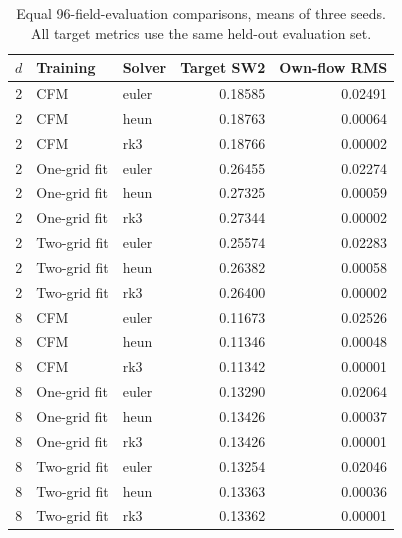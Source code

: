\begin{table}[ht]
\centering
\caption{Equal 96-field-evaluation comparisons, means of three seeds. All target metrics use the same held-out evaluation set.}
\label{tab:equal-nfe-new}
\begin{tabular}{@{}cllrr@{}}
\toprule
$d$ & Training & Solver & Target SW2 & Own-flow RMS\\
\midrule
2 & CFM & euler & 0.18585 & 0.02491\\
2 & CFM & heun & 0.18763 & 0.00064\\
2 & CFM & rk3 & 0.18766 & 0.00002\\
2 & One-grid fit & euler & 0.26455 & 0.02274\\
2 & One-grid fit & heun & 0.27325 & 0.00059\\
2 & One-grid fit & rk3 & 0.27344 & 0.00002\\
2 & Two-grid fit & euler & 0.25574 & 0.02283\\
2 & Two-grid fit & heun & 0.26382 & 0.00058\\
2 & Two-grid fit & rk3 & 0.26400 & 0.00002\\
8 & CFM & euler & 0.11673 & 0.02526\\
8 & CFM & heun & 0.11346 & 0.00048\\
8 & CFM & rk3 & 0.11342 & 0.00001\\
8 & One-grid fit & euler & 0.13290 & 0.02064\\
8 & One-grid fit & heun & 0.13426 & 0.00037\\
8 & One-grid fit & rk3 & 0.13426 & 0.00001\\
8 & Two-grid fit & euler & 0.13254 & 0.02046\\
8 & Two-grid fit & heun & 0.13363 & 0.00036\\
8 & Two-grid fit & rk3 & 0.13362 & 0.00001\\
\bottomrule
\end{tabular}
\end{table}
